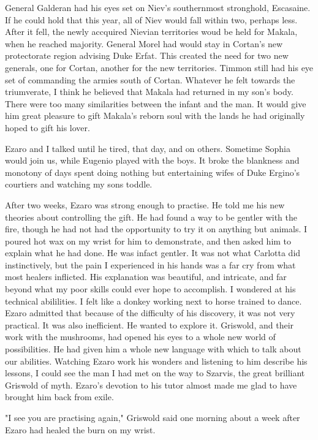 \documentclass{article}
\begin{document}
General Galderan had his eyes set on Niev's southernmost stronghold, Escasaine. If he could hold that this year, all of Niev would fall within two, perhaps less. After it fell, the newly accquired Nievian territories woud be held for Makala, when he reached majority. General Morel had would stay in Cortan's new protectorate region advising Duke Erfat. This created the need for two new generals, one for Cortan, another for the new territories. Timmon still had his eye set of commanding the armies south of Cortan. Whatever he felt towards the triumverate, I think he believed that Makala had returned in my son's body. There were too many similarities between the infant and the man. It would give him great pleasure to gift Makala's reborn soul with the lands he had originally hoped to gift his lover. 

Ezaro and I talked until he tired, that day, and on others. Sometime Sophia would join us, while Eugenio played with the boys. It broke the blankness and monotony of days spent doing nothing but entertaining wifes of Duke Ergino's courtiers and watching my sons toddle. 

After two weeks, Ezaro was strong enough to practise. He told me his new theories about controlling the gift. He had found a way to be gentler with the fire, though he had not had the opportunity to try it on anything but animals. I poured hot wax on my wrist for him to demonstrate, and then asked him to explain what he had done. He was infact gentler. It was not what Carlotta did instinctively, but the pain I experienced in his hands was a far cry from what most healers inflicted. His explanation was beautiful, and intricate, and far beyond what my poor skills could ever hope to accomplish. I wondered at his technical abililities. I felt like a donkey working next to horse trained to dance. Ezaro admitted that because of the difficulty of his discovery, it was not very practical. It was also inefficient. He wanted to explore it. Griswold, and their work with the mushrooms, had opened his eyes to a whole new world of possibilities. He had given him a whole new language with which to talk about our abilities. Watching Ezaro work his wonders and listening to him describe his lessons, I could see the man I had met on the way to Szarvis, the great brilliant Griswold of myth. Ezaro's devotion to his tutor almost made me glad to have brought him back from exile.

"I see you are practising again," Griswold said one morning about a week after Ezaro had healed the burn on my wrist. 
\end{document}
